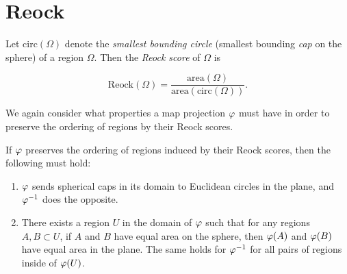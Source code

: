 \section{Reock}\label{sec:reock}

Let $\mathrm{circ}(\Omega)$ denote the \textit{smallest bounding
circle} (smallest bounding \textit{cap} on the sphere) of a region
$\Omega$.  Then the \textit{Reock score} of $\Omega$ is 

$$\mathrm{Reock}(\Omega)=
\frac{\mathrm{area}(\Omega)}{\mathrm{area}(\mathrm{circ}(\Omega))}.$$

We again consider what properties a map projection $\varphi$ must have in order to preserve the ordering of regions by their Reock scores.  

\begin{lemma}\label{lem:reock_prep}
  If $\varphi$ preserves the ordering of regions induced by their Reock scores, then the following must hold:
  \begin{enumerate}
    \item $\varphi$ sends spherical caps in its domain to Euclidean circles in the plane,  and $\varphi^{-1}$ does the opposite. 
    \item There exists a region $U$ in the domain of $\varphi$ such that for any regions $A,B\subset U$, if $A$ and $B$ have equal area on the sphere, then $\varphi(A)$ and $\varphi(B)$ have equal area in the plane.  The same holds for $\varphi^{-1}$ for all pairs of regions inside of $\varphi(U)$.
  \end{enumerate}
\end{lemma}
